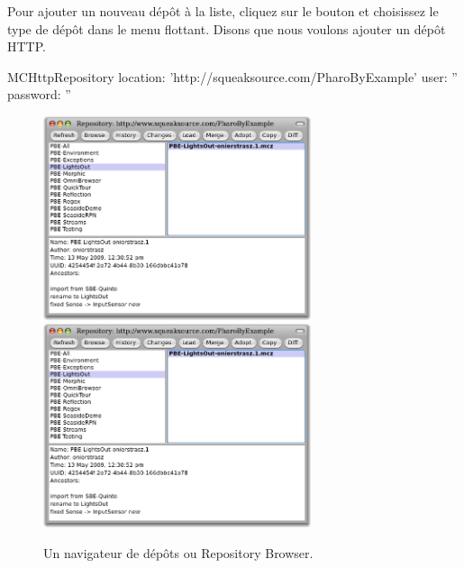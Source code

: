 \documentclass[a4paper,10pt,twoside]{book}
\begin{document}
Pour ajouter un nouveau dépôt à la liste, cliquez sur le bouton 
 et choisissez le type de dépôt dans le menu
flottant. Disons que nous voulons ajouter un dépôt HTTP.

\begin{code}{}
MCHttpRepository
	location: 'http://squeaksource.com/PharoByExample'
	user: ''
	password: ''
\end{code}

\begin{figure}[btp]
	\begin{center}
	\ifluluelse
		{\includegraphics[width=0.7\textwidth]{SqueakSource-PBE}}
		{\includegraphics[width=0.7\textwidth]{SqueakSource-PBE}}
	\end{center}
	\caption{Un navigateur de dépôts ou Repository Browser.}
\end{figure}
\noindent
\end{document}
